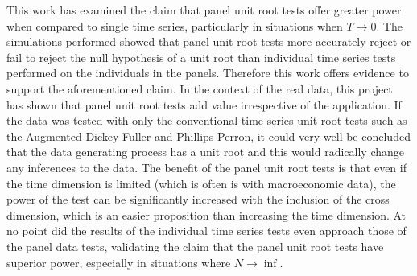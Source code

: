 This work has examined the claim that panel unit root tests offer greater power when compared to single time series, particularly in situations when $T \to 0$. The simulations performed showed that panel unit root tests more accurately reject or fail to reject the null hypothesis of a unit root than individual time series tests performed on the individuals in the panels. Therefore this work offers evidence to support the aforementioned claim. In the context of the real data, this project has shown that panel unit root tests add value irrespective of the application. If the data was tested with only the conventional time series unit root tests such as the Augmented Dickey-Fuller and Phillips-Perron, it could very well be concluded that the data generating process has a unit root and this would radically change any inferences to the data. The benefit of the panel unit root tests is that even if the time dimension is limited (which is often is with macroeconomic data), the power of the test can be significantly increased with the inclusion of the cross dimension, which is an easier proposition than increasing the time dimension. At no point did the results of the individual time series tests even approach those of the panel data tests, validating the claim that the panel unit root tests have superior power, especially in situations where $N \to \inf$.